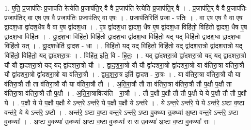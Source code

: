 \documentclass[17pt]{extarticle}
\begin{document}
1. ए॒ति॒ प्र॒जाप॑तिः प्र॒जाप॑ति रेत्येति प्र॒जाप॑ति॒र् वै वै प्र॒जाप॑ति रेत्येति प्र॒जाप॑ति॒र् वै । . प्र॒जाप॑ति॒र् वै वै प्र॒जाप॑तिः प्र॒जाप॑ति॒र् वा ए॒ष ए॒ष वै प्र॒जाप॑तिः प्र॒जाप॑ति॒र् वा ए॒षः । . प्र॒जाप॑ति॒रिति॑ प्र॒जा - प॒तिः॒ । . वा ए॒ष ए॒ष वै वा ए॒ष द्वा॑दश॒धा द्वा॑दश॒धैष वै वा ए॒ष द्वा॑दश॒धा । . ए॒ष द्वा॑दश॒धा द्वा॑दश॒ धैष ए॒ष द्वा॑दश॒धा विहि॑तो॒ विहि॑तो द्वादश॒ धैष ए॒ष द्वा॑दश॒धा विहि॑तः । . द्वा॒द॒श॒धा विहि॑तो॒ विहि॑तो द्वादश॒धा द्वा॑दश॒धा विहि॑तो॒ यद् यद् विहि॑तो द्वादश॒धा द्वा॑दश॒धा विहि॑तो॒ यत् । . द्वा॒द॒श॒धेति॑ द्वादश - धा । . विहि॑तो॒ यद् यद् विहि॑तो॒ विहि॑तो॒ यद् द्वा॑दशरा॒त्रो द्वा॑दशरा॒त्रो यद् विहि॑तो॒ विहि॑तो॒ यद् द्वा॑दशरा॒त्रः । . विहि॑त॒ इति॒ वि - हि॒तः॒ । . यद् द्वा॑दशरा॒त्रो द्वा॑दशरा॒त्रो यद् यद् द्वा॑दशरा॒त्रो यौ यौ द्वा॑दशरा॒त्रो यद् यद् द्वा॑दशरा॒त्रो यौ । . द्वा॒द॒श॒रा॒त्रो यौ यौ द्वा॑दशरा॒त्रो द्वा॑दशरा॒त्रो या व॑तिरा॒त्रा व॑तिरा॒त्रौ यौ द्वा॑दशरा॒त्रो द्वा॑दशरा॒त्रो या व॑तिरा॒त्रौ । . द्वा॒द॒श॒रा॒त्र इति॑ द्वादश - रा॒त्रः । . या व॑तिरा॒त्रा व॑तिरा॒त्रौ यौ या व॑तिरा॒त्रौ तौ ता व॑तिरा॒त्रौ यौ या व॑तिरा॒त्रौ तौ । . अ॒ति॒रा॒त्रौ तौ ता व॑तिरा॒त्रा व॑तिरा॒त्रौ तौ प॒क्षौ प॒क्षौ ता व॑तिरा॒त्रा व॑तिरा॒त्रौ तौ प॒क्षौ । . अ॒ति॒रा॒त्रावित्य॑ति - रा॒त्रौ । . तौ प॒क्षौ प॒क्षौ तौ तौ प॒क्षौ ये ये प॒क्षौ तौ तौ प॒क्षौ ये । . प॒क्षौ ये ये प॒क्षौ प॒क्षौ ये ऽन्त॒रे ऽन्त॑रे॒ ये प॒क्षौ प॒क्षौ ये ऽन्त॑रे । . ये ऽन्त॒रे ऽन्त॑रे॒ ये ये ऽन्त॑रे॒ ऽष्टा व॒ष्टा वन्त॑रे॒ ये ये ऽन्त॑रे॒ ऽष्टौ । . अन्त॑रे॒ ऽष्टा व॒ष्टा वन्त॒रे ऽन्त॑रे॒ ऽष्टा वु॒क्थ्या॑ उ॒क्थ्या॑ अ॒ष्टा वन्त॒रे ऽन्त॑रे॒ ऽष्टा वु॒क्थ्याः᳚ । . अ॒ष्टा वु॒क्थ्या॑ उ॒क्थ्या॑ अ॒ष्टा व॒ष्टा वु॒क्थ्याः᳚ स स उ॒क्थ्या॑ अ॒ष्टा व॒ष्टा वु॒क्थ्याः᳚ सः । \newline
\end{document}
